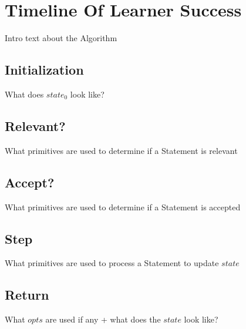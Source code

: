 \documentclass[../main.tex]{subfiles}
\begin{document}
\section{Timeline Of Learner Success}
Intro text about the Algorithm
\subsection{Initialization}
What does $state_{0}$ look like?
\subsection{Relevant?}
What primitives are used to determine if a Statement is relevant
\subsection{Accept?}
What primitives are used to determine if a Statement is accepted
\subsection{Step}
What primitives are used to process a Statement to update $state$
\subsection{Return}
What $opts$ are used if any + what does the $state$ look like?
\end{document}
